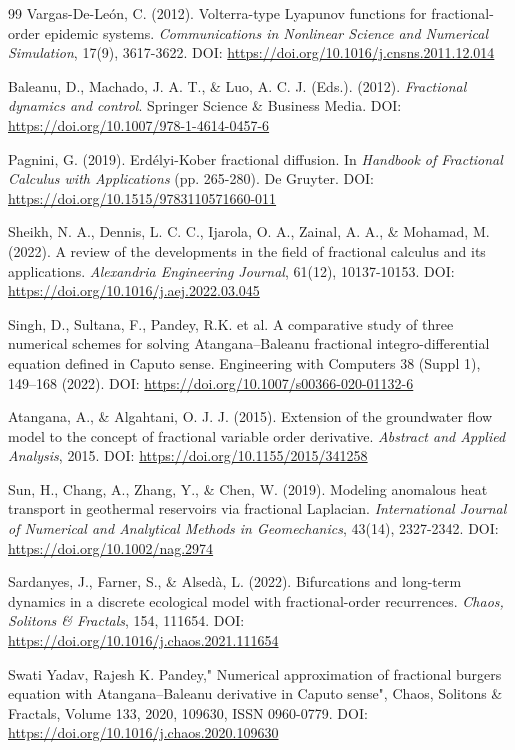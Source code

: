 \documentclass[10pt]{NSP1}
\begin{document}
\begin{thebibliography}{99}
Vargas-De-Le\'{o}n, C. (2012). Volterra-type Lyapunov functions for fractional-order epidemic systems. \emph{Communications in Nonlinear Science and Numerical Simulation}, 17(9), 3617-3622. DOI: \url{https://doi.org/10.1016/j.cnsns.2011.12.014}

Baleanu, D., Machado, J. A. T., \& Luo, A. C. J. (Eds.). (2012). \emph{Fractional dynamics and control}. Springer Science \& Business Media. DOI: \url{https://doi.org/10.1007/978-1-4614-0457-6}

Pagnini, G. (2019). Erd\'{e}lyi-Kober fractional diffusion. In \emph{Handbook of Fractional Calculus with Applications} (pp. 265-280). De Gruyter. DOI: \url{https://doi.org/10.1515/9783110571660-011}

Sheikh, N. A., Dennis, L. C. C., Ijarola, O. A., Zainal, A. A., \& Mohamad, M. (2022). A review of the developments in the field of fractional calculus and its applications. \emph{Alexandria Engineering Journal}, 61(12), 10137-10153. DOI: \url{https://doi.org/10.1016/j.aej.2022.03.045}

Singh, D., Sultana, F., Pandey, R.K. et al. A comparative study of three numerical schemes for solving Atangana--Baleanu fractional integro-differential equation defined in Caputo sense. Engineering with Computers 38 (Suppl 1), 149--168 (2022). DOI: \url{https://doi.org/10.1007/s00366-020-01132-6}

Atangana, A., \& Algahtani, O. J. J. (2015). Extension of the groundwater flow model to the concept of fractional variable order derivative. \emph{Abstract and Applied Analysis}, 2015. DOI: \url{https://doi.org/10.1155/2015/341258}

Sun, H., Chang, A., Zhang, Y., \& Chen, W. (2019). Modeling anomalous heat transport in geothermal reservoirs via fractional Laplacian. \emph{International Journal of Numerical and Analytical Methods in Geomechanics}, 43(14), 2327-2342. DOI: \url{https://doi.org/10.1002/nag.2974}

Sardanyes, J., Farner, S., \& Alsed\`{a}, L. (2022). Bifurcations and long-term dynamics in a discrete ecological model with fractional-order recurrences. \emph{Chaos, Solitons \& Fractals}, 154, 111654. DOI: \url{https://doi.org/10.1016/j.chaos.2021.111654}

Swati Yadav, Rajesh K. Pandey," Numerical approximation of fractional burgers equation with Atangana--Baleanu derivative in Caputo sense", Chaos, Solitons \& Fractals, Volume 133, 2020, 109630, ISSN 0960-0779. DOI: \url{https://doi.org/10.1016/j.chaos.2020.109630}

\end{thebibliography}
\end{document}
